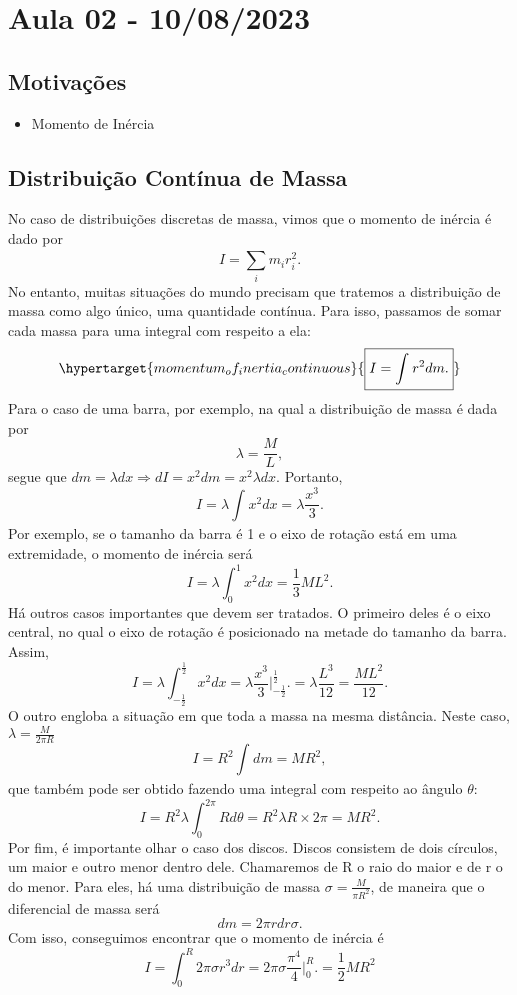 \documentclass[PhysicsII/physicsII_notes.tex]{subfiles}
\begin{document}
\section{Aula 02 - 10/08/2023}
\subsection{Motivações}
\begin{itemize}
	\item Momento de Inércia
\end{itemize}
\subsection{Distribuição Contínua de Massa}
No caso de distribuições discretas de massa, vimos que o momento de inércia é dado por
\[
	I=\sum\limits_{i}^{}m_{i}r_{i}^{2}.
\]
No entanto, muitas situações do mundo precisam que tratemos a distribuição de massa como algo único, uma
quantidade contínua. Para isso, passamos de somar cada massa para uma integral com respeito a ela:
\[
	\hypertarget{momentum_of_inertia_continuous}{\boxed{I = \int_{}^{}r^{2}dm.}}
\]
Para o caso de uma barra, por exemplo, na qual a distribuição de massa é dada por
\[
	\lambda = \frac{M}{L},
\]
segue que \(dm = \lambda dx \Rightarrow dI = x^{2}dm = x^{2}\lambda dx\). Portanto,
\[
	I = \lambda \int_{}^{}x^{2}dx = \lambda \frac{x^{3}}{3}.
\]
Por exemplo, se o tamanho da barra é 1 e o eixo de rotação está em uma extremidade, o momento de inércia será
\[
	I = \lambda \int_{0}^{1}x^{2}dx =\frac{1}{3}ML^{2}.
\]
Há outros casos importantes que devem ser tratados. O primeiro deles é o eixo central,
no qual o eixo de rotação é posicionado na metade do tamanho da barra. Assim,
\[
	I = \lambda \int_{-\frac{1}{2}}^{\frac{1}{2}}x^{2}dx = \lambda \frac{x^{3}}{3}\biggl|_{-\frac{1}{2}}^{\frac{1}{2}}\biggr. = \lambda \frac{L^{3}}{12} = \frac{ML^{2}}{12}.
\]
O outro engloba a situação em que toda a massa na mesma distância. Neste caso, \(\lambda = \frac{M}{2\pi R}\)
\[
	I = R^{2} \int_{}^{}dm = MR^{2},
\]
que também pode ser obtido fazendo uma integral com respeito ao ângulo \(\theta \):
\[
	I = R^{2}\lambda \int_{0}^{2\pi } R d\theta = R^{2}\lambda R\times2\pi = MR^{2}.
\]
Por fim, é importante olhar o caso dos discos. Discos consistem de dois círculos, um maior e outro menor dentro dele.
Chamaremos de R o raio do maior e de r o do menor. Para eles, há uma distribuição de massa
\(\sigma = \frac{M}{\pi R^{2}}\), de maneira que o diferencial de massa será
\[
	dm = 2\pi r dr\sigma.
\]
Com isso, conseguimos encontrar que o momento de inércia é
\[
	I = \int_{0}^{R}2\pi \sigma r^{3}dr = 2\pi \sigma \frac{\pi^{4}}{4}\biggl|_{0}^{R}\biggr. = \frac{1}{2}MR^{2}
\]
\end{document}
